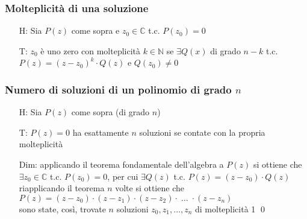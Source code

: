 \documentclass[a4paper]{article}
\begin{document}
\subsubsection*{Molteplicità di una soluzione}
\begin{itemize}
	\item[H:] Sia \(P(z)\) come sopra e \(z_0 \in \mathbb{C}\) t.c. \(P(z_0) = 0\)
	\item[T:] \(z_0\) è uno zero con molteplicità \(k \in \mathbb{N}\) se \(\exists Q(x)\) di grado \(n-k\) t.c. \\
	\(P(z) = \left( z - z_0 \right) ^ k \cdot Q(z)\) e \(Q(z_0) \neq 0\)
\end{itemize}

\subsubsection*{Numero di soluzioni di un polinomio di grado \(n\)}
\begin{itemize}
	\item[H:] Sia \(P(z)\) come sopra (di grado \(n\))
	\item[T:] \(P(z) = 0\) ha esattamente \(n\) soluzioni se contate con la propria molteplicità
	\item[Dim:] applicando il teorema fondamentale dell'algebra a \(P(z)\) si ottiene che \\
	\(\exists z_0 \in \mathbb{C}\) t.c. \(P(z_0) = 0\), per cui \(\exists Q(z)\) t.c. \(P(z) = \left( z - z_0 \right) \cdot Q(z)\)\\
	riapplicando il teorema \(n\) volte si ottiene che \\
	\(P(z) = \left( z - z_0 \right) \cdot \left( z - z_1 \right) \cdot \left( z - z_2 \right) \cdot \; \dots \; \cdot \left( z - z_n \right)\) \\
	sono state, così, trovate \(n\) soluzioni \(z_0, z_1, \dots, z_n\) di molteplicità 1 \qed
\end{itemize}
\end{document}
